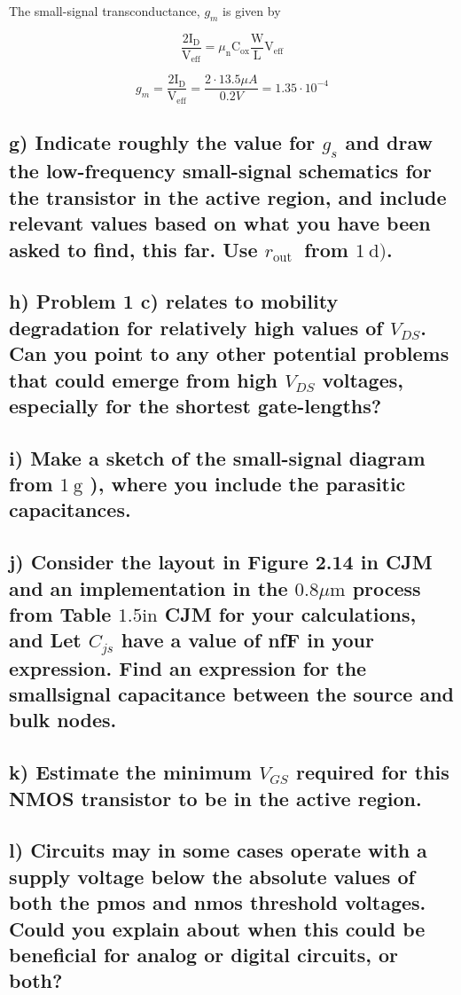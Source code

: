The small-signal transconductance, \( g_{m} \) is given by 

\begin{equation*}
    \frac{2 \mathrm{I}_{\mathrm{D}}}{\mathrm{V}_{\mathrm{eff}}}=\mu_{\mathrm{n}} \mathrm{C}_{\mathrm{ox}} \frac{\mathrm{W}}{\mathrm{L}} \mathrm{V}_{\mathrm{eff}}
\end{equation*}

\begin{equation*}
    g_m=\frac{2 \mathrm{I}_{\mathrm{D}}}{\mathrm{V}_{\mathrm{eff}}}=\frac{2\cdot 13.5\mu A}{0.2V}=1.35\cdot10^{-4}
\end{equation*}

\subsection*{g) Indicate roughly the value for \( g_{s} \) and draw the low-frequency small-signal schematics for the transistor in the active region, and include relevant values based on what you have been asked to find, this far. Use \( r_{\text {out }} \) from \( 1 \mathrm{~d}) \).}



\subsection*{h) Problem 1 c) relates to mobility degradation for relatively high values of \( V_{D S} \). Can you point to any other potential problems that could emerge from high \( V_{D S} \) voltages, especially for the shortest gate-lengths?}




\subsection*{i) Make a sketch of the small-signal diagram from \( 1 \mathrm{~g} \) ), where you include the parasitic capacitances.}


\subsection*{j) Consider the layout in Figure 2.14 in CJM and an implementation in the \( 0.8 \mu \mathrm{m} \) process from Table \( 1.5 \mathrm{in} \) CJM for your calculations, and Let \( C_{j s} \) have a value of nfF in your expression. Find an expression for the smallsignal capacitance between the source and bulk nodes.}


\subsection*{k) Estimate the minimum \( V_{G S} \) required for this NMOS transistor to be in the active region.}


\subsection*{l) Circuits may in some cases operate with a supply voltage below the absolute values of both the pmos and nmos threshold voltages. Could you explain about when this could be beneficial for analog or digital circuits, or both?}